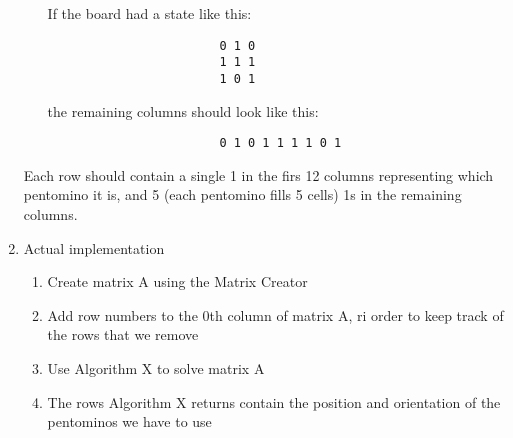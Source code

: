 \documentclass[10pt, a4paper]{article}
\begin{document}
\begin{enumerate}
\begin{itemize}
		            If the board had a state like this:

		            \begin{lstlisting}
						0 1 0
						1 1 1
						1 0 1
					\end{lstlisting}

		            the remaining columns should look like this:

		            \begin{lstlisting}
						0 1 0 1 1 1 1 0 1
					\end{lstlisting}
	      \end{itemize}

	      Each row should contain a single 1 in the firs 12 columns representing which pentomino it is, and 5 (each pentomino fills 5 cells) 1s in the remaining columns.

	\item Actual implementation

	      \begin{enumerate}
		      \item Create matrix A using the Matrix Creator
		      \item Add row numbers to the 0th column of matrix A, ri order to keep track of the rows that we remove
		      \item Use Algorithm X to solve matrix A
		      \item The rows Algorithm X returns contain the position and orientation of the pentominos we have to use
	      \end{enumerate}
\end{enumerate}
\end{document}
